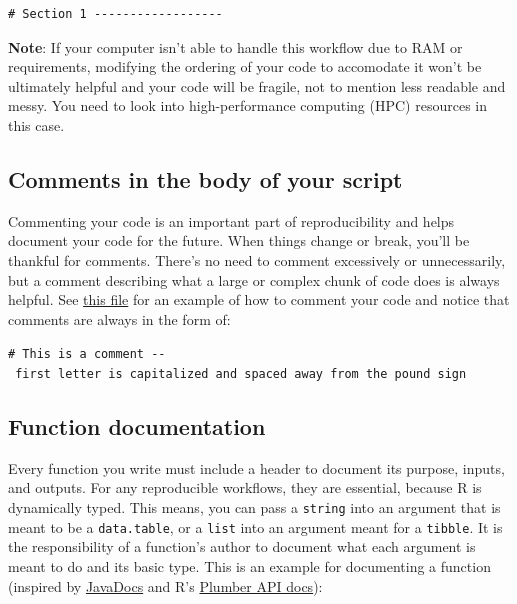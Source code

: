 \documentclass[]{book}
\begin{document}
\begin{verbatim}
# Section 1 ------------------
\end{verbatim}

\textbf{Note}: If your computer isn't able to handle this workflow due
to RAM or requirements, modifying the ordering of your code to
accomodate it won't be ultimately helpful and your code will be fragile,
not to mention less readable and messy. You need to look into
high-performance computing (HPC) resources in this case.

\subsection{Comments in the body of your
script}\label{comments-in-the-body-of-your-script}

Commenting your code is an important part of reproducibility and helps
document your code for the future. When things change or break, you'll
be thankful for comments. There's no need to comment excessively or
unnecessarily, but a comment describing what a large or complex chunk of
code does is always helpful. See
\href{https://github.com/kmishra9/Flu-Absenteeism/blob/master/Master's\%20Thesis\%20-\%20Spatial\%20Epidemiology\%20of\%20Influenza/1b\%20-\%20Map-Management.R}{this
file} for an example of how to comment your code and notice that
comments are always in the form of:

\texttt{\#\ This\ is\ a\ comment\ -\/-\ first\ letter\ is\ capitalized\ and\ spaced\ away\ from\ the\ pound\ sign}

\subsection{Function documentation}\label{function-documentation}

Every function you write must include a header to document its purpose,
inputs, and outputs. For any reproducible workflows, they are essential,
because R is dynamically typed. This means, you can pass a
\texttt{string} into an argument that is meant to be a
\texttt{data.table}, or a \texttt{list} into an argument meant for a
\texttt{tibble}. It is the responsibility of a function's author to
document what each argument is meant to do and its basic type. This is
an example for documenting a function (inspired by
\href{https://www.oracle.com/technetwork/java/javase/documentation/index-137868.html\#format}{JavaDocs}
and R's
\href{https://blog.rstudio.com/2018/10/23/rstudio-1-2-preview-plumber-integration/}{Plumber
API docs}):
\end{document}
